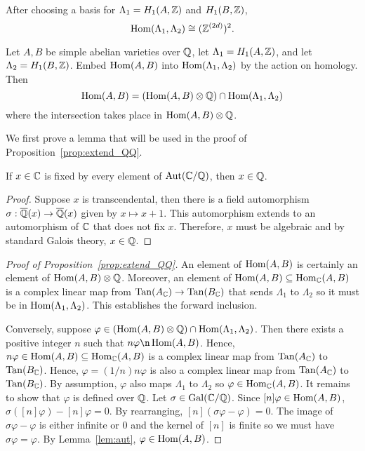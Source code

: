 After choosing a basis for $\Lambda_1 = H_1(A, \mathbb{Z})$ and $H_1(B, \mathbb{Z})$, 
\[
    \operatorname{Hom}(\Lambda_1, \Lambda_2) \cong (\mathbb{Z}^{(2d)})^2.
\]
\begin{proposition}%
    \label{prop:extend_QQ}
    Let $A, B$ be simple abelian varieties over $\mathbb{Q}$, let $\Lambda_1=H_1(A,
    \mathbb{Z})$, and let $\Lambda_2=H_1(B, \mathbb{Z})$. Embed $\operatorname{Hom}(A, B)$ into
    $\operatorname{Hom}(\Lambda_1, \Lambda_2)$ by the action on homology. Then
    \[
        \operatorname{Hom}(A, B) = 
        (\operatorname{Hom}(A, B) \otimes \mathbb{Q})\cap \operatorname{Hom}(\Lambda_1, \Lambda_2)
    \]
    where the intersection takes place in $\operatorname{Hom}(A,B)\otimes \mathbb{Q}$.
\end{proposition}

We first prove a lemma that will be used in the proof of
Proposition~\ref{prop:extend_QQ}.

\begin{lemma}%
    \label{lem:aut}
    If $x\in \mathbb{C}$ is fixed by every element of $\operatorname{Aut}(\mathbb{C}/\mathbb{Q})$, then $x\in
    \mathbb{Q}$.
\end{lemma}
\begin{proof}
    Suppose $x$ is transcendental, then there is a field automorphism
    $\sigma:\overline{\mathbb{Q}}(x)\to\overline{\mathbb{Q}}(x)$ given by $x\mapsto x+1$. This automorphism
    extends to an automorphism of $\mathbb{C}$ that does not fix $x$. Therefore, $x$
    must be algebraic and by standard Galois theory, $x\in \mathbb{Q}$.
\end{proof}

\begin{proof}[Proof of Proposition~\ref{prop:extend_QQ}]
    An element of $\operatorname{Hom}(A, B)$ is certainly an element of $\operatorname{Hom}(A, B)\otimes
    \mathbb{Q}$. Moreover, an element of $\operatorname{Hom}(A, B) \subseteq \operatorname{Hom}_{\mathbb{C}} (A,B)$ is a
    complex linear map from $\operatorname{Tan}(A_{\mathbb{C}})\to \operatorname{Tan}(B_{\mathbb{C}})$ that sends $\Lambda_1$
    to $\Lambda_2$ so it must be in $\operatorname{Hom}(\Lambda_1,\Lambda_2)$. This
    establishes the forward inclusion.

    Conversely, suppose $\varphi\in (\operatorname{Hom}(A, B)\otimes \mathbb{Q})\cap \operatorname{Hom}(\Lambda_1,
    \Lambda_2)$. Then there exists a positive integer $n$ such that $n\varphi\n
    \Hom(A, B)$. Hence, $n\varphi\in \operatorname{Hom}(A,B)\subseteq \operatorname{Hom}_{\mathbb{C}}(A, B)$ is a
    complex linear map from $\operatorname{Tan}(A_{\mathbb{C}})$ to $\operatorname{Tan}(B_{\mathbb{C}})$. Hence,
    $\varphi=(1/n)n\varphi$ is also a complex linear map from $\operatorname{Tan}(A_{\mathbb{C}})$ to
    $\operatorname{Tan}(B_{\mathbb{C}})$. By assumption, $\varphi$ also maps $\Lambda_1$ to
    $\Lambda_2$ so $\varphi\in \operatorname{Hom}_{\mathbb{C}}(A,B)$. It remains to show that
    $\varphi$ is defined over $\mathbb{Q}$. Let $\sigma\in \operatorname{Gal}(\mathbb{C}/\mathbb{Q})$. Since
    $[n]\varphi\in \operatorname{Hom}(A,B)$, $\sigma([n]\varphi)-[n]\varphi=0$. By
    rearranging, $[n](\sigma\varphi-\varphi)=0$. The image of
    $\sigma\varphi-\varphi$ is either infinite or 0 and the kernel of $[n]$ is
    finite so we must have $\sigma\varphi=\varphi$. By Lemma~\ref{lem:aut},
    $\varphi\in \operatorname{Hom}(A,B)$.
\end{proof}


